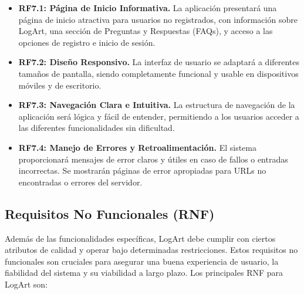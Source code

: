 \begin{itemize}
    \item \textbf{RF7.1: Página de Inicio Informativa.} La aplicación presentará una página de inicio atractiva para usuarios no registrados, con información sobre LogArt, una sección de Preguntas y Respuestas (FAQs), y acceso a las opciones de registro e inicio de sesión.
    \item \textbf{RF7.2: Diseño Responsivo.} La interfaz de usuario se adaptará a diferentes tamaños de pantalla, siendo completamente funcional y usable en dispositivos móviles y de escritorio.
    \item \textbf{RF7.3: Navegación Clara e Intuitiva.} La estructura de navegación de la aplicación será lógica y fácil de entender, permitiendo a los usuarios acceder a las diferentes funcionalidades sin dificultad.
    \item \textbf{RF7.4: Manejo de Errores y Retroalimentación.} El sistema proporcionará mensajes de error claros y útiles en caso de fallos o entradas incorrectas. Se mostrarán páginas de error apropiadas para URLs no encontradas o errores del servidor.
\end{itemize}

\subsection{Requisitos No Funcionales (RNF)}
\label{ssec:requisitosNoFuncionales}

Además de las funcionalidades específicas, LogArt debe cumplir con ciertos atributos de calidad y operar bajo determinadas restricciones. Estos requisitos no funcionales son cruciales para asegurar una buena experiencia de usuario, la fiabilidad del sistema y su viabilidad a largo plazo. Los principales RNF para LogArt son:

